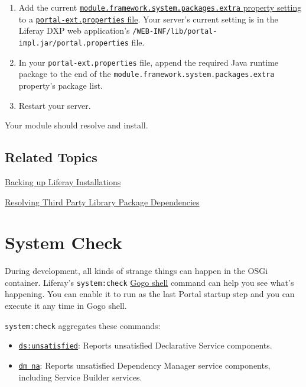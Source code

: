 \begin{enumerate}
\def\labelenumi{\arabic{enumi}.}
\item
  Add the current
  \href{https://docs.liferay.com/dxp/portal/7.2-latest/propertiesdoc/portal.properties.html\#Module\%20Framework}{\texttt{module.framework.system.packages.extra}
  property setting} to a
  \href{/docs/7-2/deploy/-/knowledge_base/d/portal-properties}{\texttt{portal-ext.properties}
  file}. Your server's current setting is in the Liferay DXP web
  application's \texttt{/WEB-INF/lib/portal-impl.jar/portal.properties}
  file.
\item
  In your \texttt{portal-ext.properties} file, append the required Java
  runtime package to the end of the
  \texttt{module.framework.system.packages.extra} property's package
  list.
\item
  Restart your server.
\end{enumerate}

Your module should resolve and install.

\section{Related Topics}\label{related-topics-35}

\href{/docs/7-2/deploy/-/knowledge_base/d/backing-up-a-liferay-installation}{Backing
up Liferay Installations}

\href{https://portal.liferay.dev/docs/7-2/customization/-/knowledge_base/c/adding-third-party-libraries-to-a-module}{Resolving
Third Party Library Package Dependencies}

\chapter{System Check}\label{system-check}

During development, all kinds of strange things can happen in the OSGi
container. Liferay's \texttt{system:check}
\href{/docs/7-2/customization/-/knowledge_base/c/using-the-felix-gogo-shell}{Gogo
shell} command can help you see what's happening. You can enable it to
run as the last Portal startup step and you can execute it any time in
Gogo shell.

\texttt{system:check} aggregates these commands:

\begin{itemize}
\item
  \href{/docs/7-2/appdev/-/knowledge_base/a/detecting-unresolved-osgi-components\#dsunsatisfied-command}{\texttt{ds:unsatisfied}}:
  Reports unsatisfied Declarative Service components.
\item
  \href{/docs/7-2/appdev/-/knowledge_base/a/detecting-unresolved-osgi-components\#dm-na-command}{\texttt{dm\ na}}:
  Reports unsatisfied Dependency Manager service components, including
  Service Builder services.
\end{itemize}

